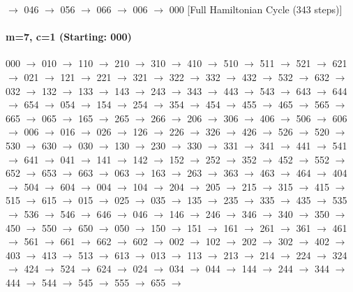 $\rightarrow$ 046 $\rightarrow$ 056 $\rightarrow$ 066 $\rightarrow$ 006 $\rightarrow$ 000 
[Full Hamiltonian Cycle (343 steps)]


\paragraph{ m=7, c=1 (Starting: 000)}



000 $\rightarrow$ 010 $\rightarrow$ 110 $\rightarrow$ 210 $\rightarrow$ 310 $\rightarrow$ 410 $\rightarrow$ 510 $\rightarrow$ 511 $\rightarrow$ 521 $\rightarrow$ 621 $\rightarrow$ 021 $\rightarrow$ 121 $\rightarrow$ 221 $\rightarrow$ 321 $\rightarrow$ 322 $\rightarrow$ 332 $\rightarrow$ 432 $\rightarrow$ 532 $\rightarrow$ 632 $\rightarrow$ 032 $\rightarrow$ 132 $\rightarrow$ 133 $\rightarrow$ 143 $\rightarrow$ 243 $\rightarrow$ 343 $\rightarrow$ 443 $\rightarrow$ 543 $\rightarrow$ 643 $\rightarrow$ 644 $\rightarrow$ 654 $\rightarrow$ 054 $\rightarrow$ 154 $\rightarrow$ 254 $\rightarrow$ 354 $\rightarrow$ 454 $\rightarrow$ 455 $\rightarrow$ 465 $\rightarrow$ 565 $\rightarrow$ 665 $\rightarrow$ 065 $\rightarrow$ 165 $\rightarrow$ 265 $\rightarrow$ 266 $\rightarrow$ 206 $\rightarrow$ 306 $\rightarrow$ 406 $\rightarrow$ 506 $\rightarrow$ 606 $\rightarrow$ 006 $\rightarrow$ 016 $\rightarrow$ 026 $\rightarrow$ 126 $\rightarrow$ 226 $\rightarrow$ 326 $\rightarrow$ 426 $\rightarrow$ 526 $\rightarrow$ 520 $\rightarrow$ 530 $\rightarrow$ 630 $\rightarrow$ 030 $\rightarrow$ 130 $\rightarrow$ 230 $\rightarrow$ 330 $\rightarrow$ 331 $\rightarrow$ 341 $\rightarrow$ 441 $\rightarrow$ 541 $\rightarrow$ 641 $\rightarrow$ 041 $\rightarrow$ 141 $\rightarrow$ 142 $\rightarrow$ 152 $\rightarrow$ 252 $\rightarrow$ 352 $\rightarrow$ 452 $\rightarrow$ 552 $\rightarrow$ 652 $\rightarrow$ 653 $\rightarrow$ 663 $\rightarrow$ 063 $\rightarrow$ 163 $\rightarrow$ 263 $\rightarrow$ 363 $\rightarrow$ 463 $\rightarrow$ 464 $\rightarrow$ 404 $\rightarrow$ 504 $\rightarrow$ 604 $\rightarrow$ 004 $\rightarrow$ 104 $\rightarrow$ 204 $\rightarrow$ 205 $\rightarrow$ 215 $\rightarrow$ 315 $\rightarrow$ 415 $\rightarrow$ 515 $\rightarrow$ 615 $\rightarrow$ 015 $\rightarrow$ 025 $\rightarrow$ 035 $\rightarrow$ 135 $\rightarrow$ 235 $\rightarrow$ 335 $\rightarrow$ 435 $\rightarrow$ 535 $\rightarrow$ 536 $\rightarrow$ 546 $\rightarrow$ 646 $\rightarrow$ 046 $\rightarrow$ 146 $\rightarrow$ 246 $\rightarrow$ 346 $\rightarrow$ 340 $\rightarrow$ 350 $\rightarrow$ 450 $\rightarrow$ 550 $\rightarrow$ 650 $\rightarrow$ 050 $\rightarrow$ 150 $\rightarrow$ 151 $\rightarrow$ 161 $\rightarrow$ 261 $\rightarrow$ 361 $\rightarrow$ 461 $\rightarrow$ 561 $\rightarrow$ 661 $\rightarrow$ 662 $\rightarrow$ 602 $\rightarrow$ 002 $\rightarrow$ 102 $\rightarrow$ 202 $\rightarrow$ 302 $\rightarrow$ 402 $\rightarrow$ 403 $\rightarrow$ 413 $\rightarrow$ 513 $\rightarrow$ 613 $\rightarrow$ 013 $\rightarrow$ 113 $\rightarrow$ 213 $\rightarrow$ 214 $\rightarrow$ 224 $\rightarrow$ 324 $\rightarrow$ 424 $\rightarrow$ 524 $\rightarrow$ 624 $\rightarrow$ 024 $\rightarrow$ 034 $\rightarrow$ 044 $\rightarrow$ 144 $\rightarrow$ 244 $\rightarrow$ 344 $\rightarrow$ 444 $\rightarrow$ 544 $\rightarrow$ 545 $\rightarrow$ 555 $\rightarrow$ 655 $\rightarrow$ 